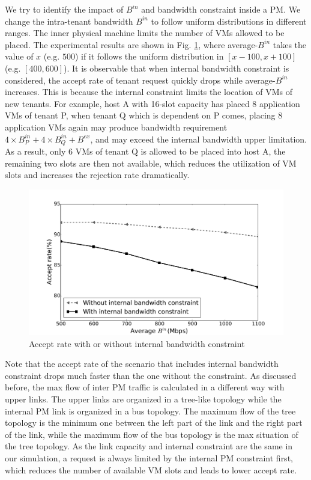 \documentclass[10pt, conference, letterpaper]{IEEEtran}
\begin{document}
We try to identify the impact of $B^{in}$ and bandwidth constraint inside a PM. We change the intra-tenant bandwidth $B^{in}$ to follow uniform distributions in different ranges. The inner physical machine limits the number of VMs allowed to be placed. The experimental results are shown in Fig. \ref{fig:constr}, where average-$B^{in}$ takes the value of $x$ (e.g. $500$) if it follows the uniform distribution in $[x-100, x+100]$ (e.g. $[400, 600]$). It is observable that when internal bandwidth constraint is considered, the accept rate of tenant request quickly drops while average-$B^{in}$ increases. This is because the internal constraint limits the location of VMs of new tenants. For example, host A with 16-slot capacity has placed 8 application VMs of tenant P, when tenant Q which is dependent on P comes, placing 8 application VMs again may produce bandwidth requirement $4 \times B_P^{in}+4 \times B_Q^{in}+B^{ex}$, and may exceed the internal bandwidth upper limitation. As a result, only 6 VMs of tenant Q is allowed to be placed into host A, the remaining two slots are then not available, which reduces the utilization of VM slots and increases the rejection rate dramatically.


\begin{figure}
\center
    \includegraphics[width=2.8 in]{fig/Constraint.pdf}
    \caption{Accept rate with or without internal bandwidth constraint}
    \label{fig:constr}
\end{figure}

Note that the accept rate of the scenario that includes internal bandwidth constraint drops much faster than the one without the constraint. As discussed before, the max flow of inter PM traffic is calculated in a different way with upper links. The upper links are organized in a tree-like topology while the internal PM link is organized in a bus topology. The maximum flow of the tree topology is the minimum one between the left part of the link and the right part of the link, while the maximum flow of the bus topology is the max situation of the tree topology. As the link capacity and internal constraint are the same in our simulation, a request is always limited by the internal PM constraint first, which reduces the number of available VM slots and leads to lower accept rate.
\end{document}
